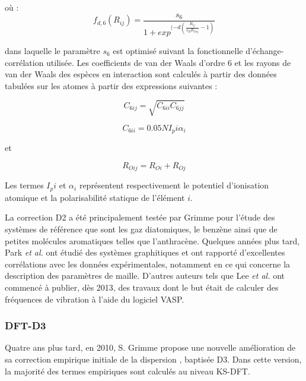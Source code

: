 {	\noindent où :
	\begin{equation}
	f_{d,6} (R_{ij})= \frac{s_{6}}{1+exp^{(-d(\frac{R_{ij}}{s_{R}R_{Oij}}-1)}}  
	\end{equation}
	
	dans laquelle le paramètre $s_{6}$ est optimisé suivant la fonctionnelle d’échange-corrélation utilisée. Les coefficients de van der Waals d’ordre 6 et les rayons de van der Waals des espèces en interaction sont calculés à partir des données tabulées sur les atomes à partir des expressions suivantes :
	
	\begin{equation}
	C_{6ij} =\sqrt{C_{6ii}C_{6jj}}  
	\end{equation}
	
	\begin{equation}
	C_{6ii} = 0.05NI_{p}{i} \alpha_{i}
	\end{equation}
	
	et 
	
	\begin{equation}
	R_{Oij} = R_{Oi} + R_{Oj}
	\end{equation}
	
	Les termes $I_{p}{i}$ et $\alpha_{i}$ représentent respectivement le potentiel d’ionisation atomique et la polarisabilité statique de l’élément $i$.
	
	La correction D2 a été principalement testée par Grimme \cite{grimme2006semiempirical} pour l’étude des systèmes de référence que sont les gaz diatomiques, le benzène ainsi que de petites molécules aromatiques telles que l’anthracène. Quelques années plus tard, Park \textit{et al.} \cite{park2011ab} ont étudié des systèmes graphitiques et ont rapporté d’excellentes corrélations avec les données expérimentales, notamment en ce qui concerne la description des paramètres de maille. D’autres auteurs tels que Lee \textit{et al.} \cite{lee2013sum} ont commencé à publier, dès 2013, des travaux dont le but était de calculer des fréquences de vibration à l’aide du logiciel VASP.
	
	\subsubsection{DFT-D3}
	
	Quatre ans plus tard, en 2010, S. Grimme \cite{grimme2006semiempirical} propose une nouvelle amélioration de sa correction empirique initiale de la dispersion \cite{grimme2004accurate}, baptisée D3. Dans cette version, la majorité des termes empiriques sont calculés au niveau KS-DFT.
	
}
